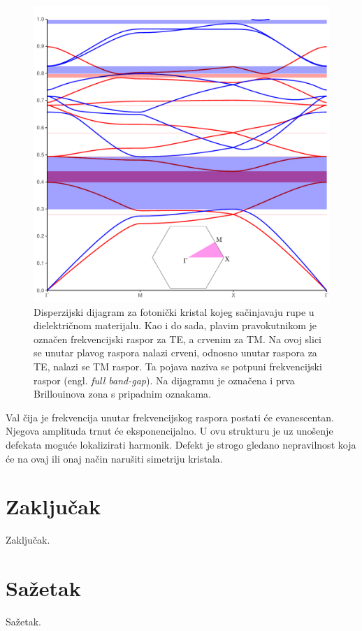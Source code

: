 \documentclass[utf8, seminar]{fer}
\begin{document}
\begin{figure}[ht]
	\centering
	\includegraphics[width = 1.0\linewidth]{./images/triangular_holes.pdf}
	\caption{Disperzijski dijagram za fotonički kristal kojeg sačinjavaju rupe
	u dielektričnom materijalu. Kao i do sada, plavim pravokutnikom je označen
	frekvencijski raspor za TE, a crvenim za TM. Na ovoj slici se unutar plavog
	raspora nalazi crveni, odnosno unutar raspora za TE, nalazi se TM raspor. Ta
	pojava naziva se potpuni frekvencijski raspor (engl. \textit{full band-gap}).
	Na dijagramu je označena i prva Brillouinova zona s pripadnim oznakama.}
	\label{fig:triangular_full_band}
\end{figure}

Val čija je frekvencija unutar frekvencijskog
raspora postati će evanescentan. Njegova amplituda trnut će eksponencijalno. U
ovu strukturu je uz unošenje defekata moguće lokalizirati harmonik. Defekt je
strogo gledano nepravilnost koja će na ovaj ili onaj način narušiti simetriju
kristala.


\chapter{Zaključak}
Zaključak.



\nocite{*}

\chapter{Sažetak}
Sažetak.
\end{document}
